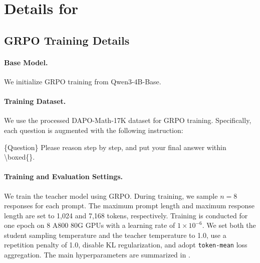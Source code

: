 \appendix

\section{Details for }

\subsection{GRPO Training Details}
\label{app:grpo_details}

\paragraph{Base Model.}
We initialize GRPO training from Qwen3-4B-Base.

\paragraph{Training Dataset.}
We use the processed DAPO-Math-17K dataset for GRPO training. Specifically, each question is augmented with the following instruction:
\begin{tcolorbox}[title=\textbf{GRPO dataset template}, colback=CornflowerBlue!20, colframe=CornflowerBlue!90!Black]
\small
\{Question\} Please reason step by step, and put your final answer within \textbackslash boxed\{\}.
\end{tcolorbox}

\paragraph{Training and Evaluation Settings.}
We train the teacher model using GRPO. During training, we sample $n=8$ responses for each prompt. The maximum prompt length and maximum response length are set to 1,024 and 7,168 tokens, respectively. Training is conducted for one epoch on 8 A800 80G GPUs with a learning rate of $1\times10^{-6}$. We set both the student sampling temperature and the teacher temperature to 1.0, use a repetition penalty of 1.0, disable KL regularization, and adopt \texttt{token-mean} loss aggregation. The main hyperparameters are summarized in .

